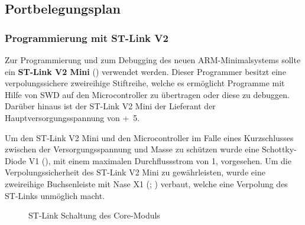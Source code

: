 \subsection{Portbelegungsplan}
\label{sec:coremodul-portbelegung}

\subsubsection{Programmierung mit ST-Link V2}
\label{sec:coremodul-stlink}
Zur Programmierung und zum \gls{Debugging} des neuen \gls{ARM}-\gls{Minimalsystem}s sollte ein \textbf{ST-Link V2 Mini} () verwendet werden. Dieser Programmer besitzt eine verpolungssichere zweireihige Stiftreihe, welche es ermöglicht Programme mit Hilfe von \gls{SWD} auf den Microcontroller zu übertragen oder diese zu debuggen. Darüber hinaus ist der ST-Link V2 Mini der Lieferant der Hauptversorgungsspannung von \unit{+5}{\volt}.

Um den ST-Link V2 Mini und den Microcontroller im Falle eines Kurzschlusses zwischen der Versorgungsspannung und Masse zu schützen wurde eine Schottky-Diode V1 (), mit einem maximalen Durchflussstrom von \unit{1}{\ampere}, vorgesehen. Um die Verpolungssicherheit des ST-Link V2 Mini zu gewährleisten, wurde eine zweireihige Buchsenleiste mit Nase X1 (; ) verbaut, welche eine Verpolung des ST-Links unmöglich macht.


\begin{figure}[H]
    \centering
    \qquad
    \qquad
    \caption[ST-Link Schaltung des Core-Moduls]{ST-Link Schaltung des \gls{Core-Modul}s}
    \label{fig:coremodul-swd}
\end{figure}

